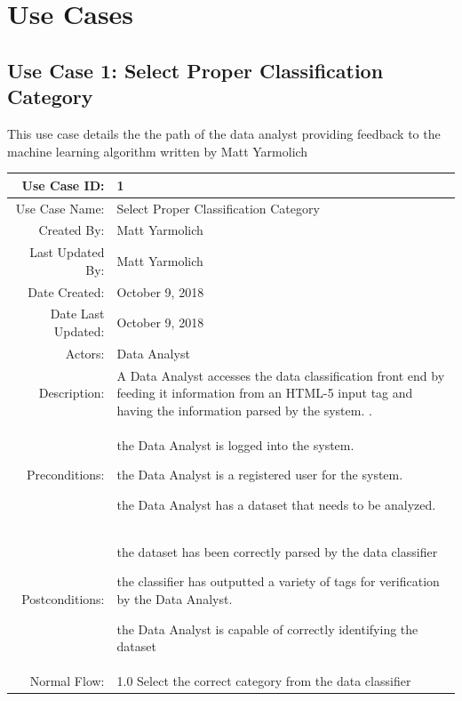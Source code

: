 \documentclass[12pt,oneside,letterpaper]{article}
\newenvironment{packed_enumerate}{ %
\vspace{-7mm}
\begin{enumerate}
  \setlength{\itemsep}{0pt}
  \setlength{\parskip}{0pt}
  \setlength{\parsep}{0pt}
}{\end{enumerate}
\vspace{-8mm}}
\begin{document}
\section{Use Cases}

\subsection{\label{Selecting the Proper Classification from the UIl}Use Case 1: Select Proper Classification Category}
This use case details the the path of the data analyst providing feedback to the machine learning algorithm written by Matt Yarmolich

\begin{longtable}{|r|p{3.8in}|}
\hline
Use Case ID:&1\\
\hline
Use Case Name:&Select Proper Classification Category\\
\hline
Created By:&Matt Yarmolich\\
\hline
Last Updated By:&Matt Yarmolich\\
\hline
Date Created:&October 9, 2018\\
\hline
Date Last Updated:&October 9, 2018\\
\hline
Actors:&Data Analyst\\
\hline
Description:&A Data Analyst accesses the data classification front end by feeding it information from an HTML-5 input tag and having the information parsed by the system. .\\
\hline
Preconditions:&
\begin{packed_enumerate}
\item the Data Analyst is logged into the system.
\item the Data Analyst is a registered user for the system.
\item the Data Analyst has a dataset that needs to be analyzed.
\end{packed_enumerate}\\
\hline
Postconditions:&
\begin{packed_enumerate}
\item the dataset has been correctly parsed by the data classifier
\item the classifier has outputted a variety of tags for verification by the Data Analyst. 
\item the Data Analyst is capable of correctly identifying the dataset
\end{packed_enumerate}\\
\hline
Normal Flow:&1.0 Select the correct category from the data classifier\\

\end{longtable}
\end{document}
